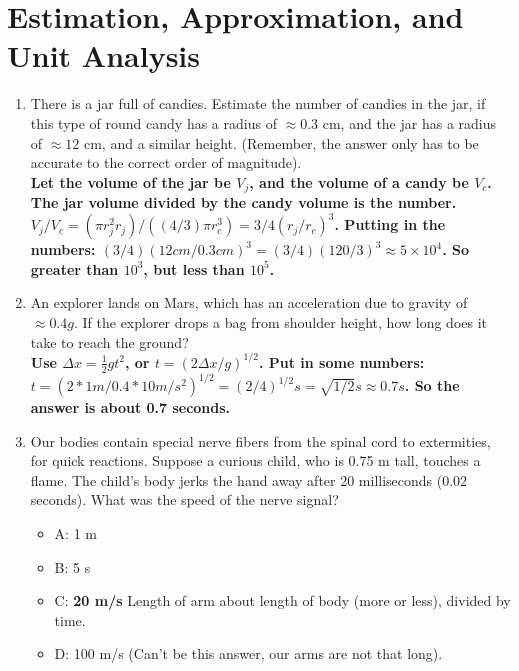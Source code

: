 \documentclass[10pt]{article}
\begin{document}
\maketitle

\section{Estimation, Approximation, and Unit Analysis}
\begin{enumerate}
\item There is a jar full of candies.  Estimate the number of candies in the jar, if this type of round candy has a radius of $\approx 0.3$ cm, and the jar has a radius of $\approx 12$ cm, and a similar height.  (Remember, the answer only has to be accurate to the correct order of magnitude).
\vspace{0.5 cm} \\
\textbf{Let the volume of the jar be $V_j$, and the volume of a candy be $V_c$.  The jar volume divided by the candy volume is the number.  $V_j / V_c = (\pi r_j^2 r_j)/((4/3)\pi r_c^3) = 3/4 (r_j/r_c)^3$.  Putting in the numbers: $(3/4)(12 cm/0.3 cm)^3 = (3/4)(120/3)^3 \approx 5 \times 10^4$.  So greater than $10^3$, but less than $10^5$.}
\vspace{0.4 cm}
\item An explorer lands on Mars, which has an acceleration due to gravity of $\approx 0.4 g$.  If the explorer drops a bag from shoulder height, how long does it take to reach the ground?
\vspace{0.5 cm} \\
\textbf{Use $\Delta x = \frac{1}{2}gt^2$, or $t = (2\Delta x/g)^{1/2}$.  Put in some numbers: $t = (2*1 m/0.4*10 m/s^2)^{1/2} = (2/4)^{1/2} s = \sqrt{1/2} s \approx 0.7 s$.  So the answer is about 0.7 seconds.}
\vspace{0.2 cm}
\item Our bodies contain special nerve fibers from the spinal cord to extermities, for quick reactions.  Suppose a curious child, who is 0.75 m tall, touches a flame.  The child's body jerks the hand away after 20 milliseconds (0.02 seconds).  What was the speed of the nerve signal? \\
\begin{itemize}
\item A: 1 m
\item B: 5 s
\item C: \textbf{20 m/s} Length of arm about length of body (more or less), divided by time.
\item D: 100 m/s (Can't be this answer, our arms are not that long).
\end{itemize}
\end{enumerate}
\end{document}
